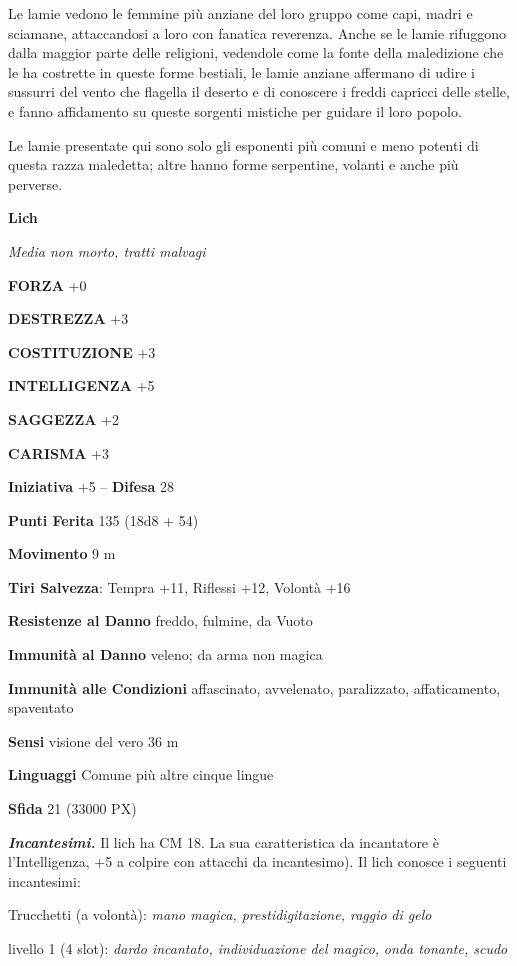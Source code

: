 \begin{multicols}{2}
	Le lamie vedono le femmine più anziane del loro gruppo come capi, madri e sciamane, attaccandosi a loro con fanatica reverenza. Anche se le lamie rifuggono dalla maggior parte delle religioni, vedendole come la fonte della maledizione che le ha costrette in queste forme bestiali, le lamie anziane affermano di udire i sussurri del vento che flagella il deserto e di conoscere i freddi capricci delle stelle, e fanno affidamento su queste sorgenti mistiche per guidare il loro popolo.

	Le lamie presentate qui sono solo gli esponenti più comuni e meno potenti di questa razza maledetta; altre hanno forme serpentine, volanti e anche più perverse.


	\medskip{}\textbf{Lich}

	\textit{Media non morto, tratti malvagi}

	\textbf{FORZA} +0

	\textbf{DESTREZZA} +3

	\textbf{COSTITUZIONE} +3

	\textbf{INTELLIGENZA} +5

	\textbf{SAGGEZZA} +2

	\textbf{CARISMA} +3

	\textbf{Iniziativa} +5 -- \textbf{Difesa} 28

	\textbf{Punti Ferita} 135 (18d8 + 54)

	\textbf{Movimento} 9 m

	\textbf{Tiri Salvezza}: Tempra +11, Riflessi +12, Volontà +16

	\textbf{Resistenze al Danno} freddo, fulmine, da Vuoto

	\textbf{Immunità al Danno} veleno; da arma non magica

	\textbf{Immunità alle Condizioni} affascinato, avvelenato, paralizzato, affaticamento, spaventato

	\textbf{Sensi} visione del vero 36 m

	\textbf{Linguaggi} Comune più altre cinque lingue

	\textbf{Sfida} 21 (33000 PX)

	\textit{\textbf{Incantesimi.}} Il lich ha CM 18. La sua caratteristica da incantatore è l'Intelligenza, +5 a colpire con attacchi da incantesimo). Il lich conosce i seguenti incantesimi:

	Trucchetti (a volontà): \textit{mano magica, prestidigitazione, raggio} \textit{di gelo}

	livello 1 (4 slot): \textit{dardo incantato, individuazione del magico,} \textit{onda tonante, scudo}


\end{multicols}
